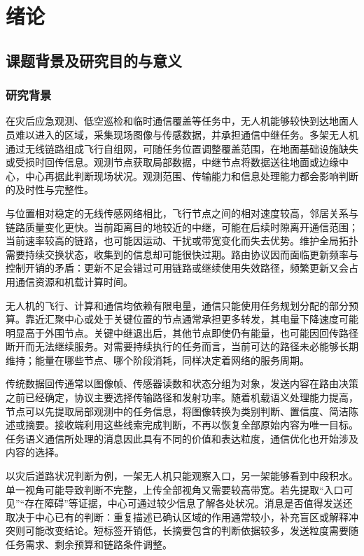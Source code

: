 \chapter{绪论}
\label{ch:introduction}

\section{课题背景及研究目的与意义}
\subsection{研究背景}

在灾后应急观测、低空巡检和临时通信覆盖等任务中，无人机能够较快到达地面人员难以进入的区域，采集现场图像与传感数据，并承担通信中继任务\cite{intro3,zeng2016uav}。多架无人机通过无线链路组成飞行自组网，可随任务位置调整覆盖范围，在地面基础设施缺失或受损时回传信息。观测节点获取局部数据，中继节点将数据送往地面或边缘中心，中心再据此判断现场状况。观测范围、传输能力和信息处理能力都会影响判断的及时性与完整性。

与位置相对稳定的无线传感网络相比，飞行节点之间的相对速度较高，邻居关系与链路质量变化更快。当前距离目的地较近的中继，可能在后续时隙离开通信范围；当前速率较高的链路，也可能因运动、干扰或带宽变化而失去优势。维护全局拓扑需要持续交换状态，收集到的信息却可能很快过期。路由协议因而面临更新频率与控制开销的矛盾：更新不足会错过可用链路或继续使用失效路径，频繁更新又会占用通信资源和机载计算时间。

无人机的飞行、计算和通信均依赖有限电量，通信只能使用任务规划分配的部分预算。靠近汇聚中心或处于关键位置的节点通常承担更多转发，其电量下降速度可能明显高于外围节点。关键中继退出后，其他节点即使仍有能量，也可能因回传路径断开而无法继续服务。对需要持续执行的任务而言，当前可达的路径未必能够长期维持；能量在哪些节点、哪个阶段消耗，同样决定着网络的服务周期。

传统数据回传通常以图像帧、传感器读数和状态分组为对象，发送内容在路由决策之前已经确定，协议主要选择传输路径和发射功率。随着机载语义处理能力提高，节点可以先提取局部观测中的任务信息，将图像转换为类别判断、置信度、简洁陈述或摘要。接收端利用这些线索完成判断，不再以恢复全部原始内容为唯一目标。任务语义通信所处理的消息因此具有不同的价值和表达粒度，通信优化也开始涉及内容的选择\cite{semantic-communications-jsac,semantic-communications-survey}。

以灾后道路状况判断为例，一架无人机只能观察入口，另一架能够看到中段积水。单一视角可能导致判断不完整，上传全部视角又需要较高带宽。若先提取“入口可见”“存在障碍”等证据，中心可通过较少信息了解各处状况。消息是否值得发送还取决于中心已有的判断：重复描述已确认区域的作用通常较小，补充盲区或解释冲突则可能改变结论。短标签开销低，长摘要包含的判断依据较多，发送粒度需要随任务需求、剩余预算和链路条件调整。

